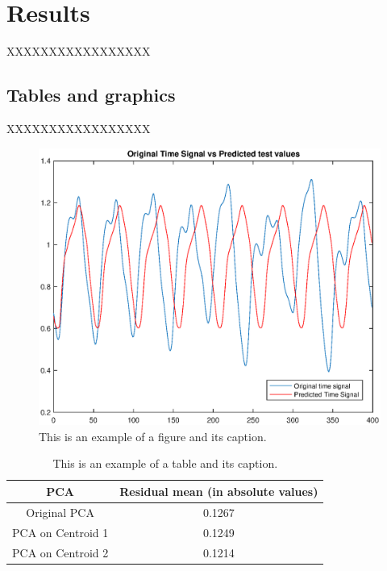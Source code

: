 \chapter{Results}

XXXXXXXXXXXXXXXXX

\section{Tables and graphics}

XXXXXXXXXXXXXXXXX

\begin{figure}[!ht]
\includegraphics[clip,width=\columnwidth]{figures/PlotTimeSeriesResult}%
\caption{This is an example of a figure and its caption.}
\label{fig:timeseries}
\end{figure}

\begin{table}[!ht]
\renewcommand{\arraystretch}{1.50}
\caption{This is an example of a table and its caption.}
\label{tablePCA}
\centering
\begin{tabular}{| c | c |}
\hline
\bfseries PCA & \bfseries Residual mean (in absolute values) \\
\hline\hline
Original PCA & 0.1267  \\
\hline
PCA on Centroid 1 & 0.1249\\
\hline
PCA on Centroid 2 & 0.1214  \\
\hline
\end{tabular}
\end{table}

\newpage



